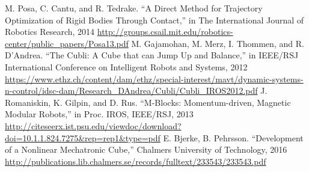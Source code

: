 \documentclass[conference]{IEEEtran}
\begin{document}
\begin{thebibliography}{00}
 M. Posa, C. Cantu, and R. Tedrake. ``A Direct Method for Trajectory Optimization of Rigid Bodies Through Contact,'' in The International Journal of Robotics Research, 2014 \url{http://groups.csail.mit.edu/robotics-center/public_papers/Posa13.pdf}
 M. Gajamohan, M. Merz, I. Thommen, and R. D'Andrea. ``The Cubli: A Cube that can Jump Up and Balance,'' in IEEE/RSJ International Conference on
Intelligent Robots and Systems, 2012 \url{https://www.ethz.ch/content/dam/ethz/special-interest/mavt/dynamic-systems-n-control/idsc-dam/Research_DAndrea/Cubli/Cubli_IROS2012.pdf}
 J. Romaniskin, K. Gilpin, and D. Rus. ``M-Blocks: Momentum-driven, Magnetic Modular Robots,'' in Proc. IROS, IEEE/RSJ, 2013
\url{http://citeseerx.ist.psu.edu/viewdoc/download?doi=10.1.1.824.7275&rep=rep1&type=pdf}
 E. Bjerke, B. Pehrsson. ``Development of a Nonlinear Mechatronic Cube,'' Chalmers University of Technology, 2016
\url{http://publications.lib.chalmers.se/records/fulltext/233543/233543.pdf}
\end{thebibliography}
\vspace{12pt}
\end{document}
